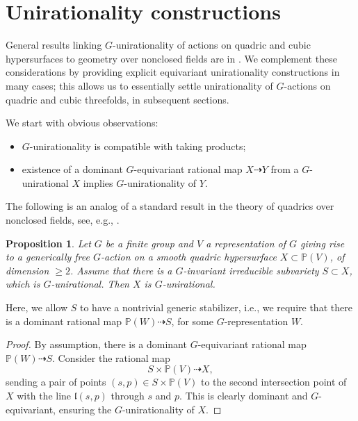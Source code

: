 \documentclass[12pt,reqno]{amsart}
\theoremstyle{plain}
\newtheorem{prop}{Proposition}[section]
\theoremstyle{remark}
\theoremstyle{definition}
\numberwithin{equation}{section}
\def\bP{{\mathbb P}}
\begin{document}
\section{Unirationality constructions}
\label{sect:cubic}


General results linking $G$-unirationality of actions on quadric and cubic hypersurfaces to geometry over nonclosed fields are in \cite[Section 10]{DR}. We complement these considerations by providing explicit equivariant unirationality constructions in many cases; this allows us to essentially settle unirationality of $G$-actions on quadric and cubic threefolds, in subsequent sections.    


We start with obvious observations: 
\begin{itemize}
    \item $G$-unirationality is compatible with taking products; 
    \item existence of a dominant $G$-equivariant rational map 
    $X\dashrightarrow Y$ from a 
    $G$-unirational $X$ implies $G$-unirationality of $Y$. 
\end{itemize}

The following is an analog of a standard result in the theory of quadrics over nonclosed fields, see, e.g., \cite[Chapter 4]{EKMbook}.

\begin{prop}
\label{prop:quad-genu}
Let $G$ be a finite group and $V$ a representation of $G$ giving rise to a generically free $G$-action on a smooth quadric hypersurface $X\subset \bP(V)$, of dimension $\ge 2$.    
Assume that there is a $G$-invariant irreducible subvariety $S\subset X$,
which is $G$-unirational. Then $X$ is $G$-unirational. 
\end{prop}

Here, we allow $S$ to have a nontrivial generic stabilizer, i.e., we require that there is a dominant rational map $\bP(W)\dashrightarrow S$, for some $G$-representation $W$.  

\begin{proof}
By assumption, there is a dominant $G$-equivariant rational map $\bP(W)\dashrightarrow S$. 
Consider the rational map
$$
S\times \bP(V) \dashrightarrow  X,
$$
sending a pair of points $(s,p)\in S\times \bP(V)$ to the second 
intersection point of $X$ with the line 
$\mathfrak l(s,p)$ through $s$ and $p$. This is clearly dominant and $G$-equivariant, ensuring the $G$-unirationality of $X$.  
\end{proof}
\end{document}
